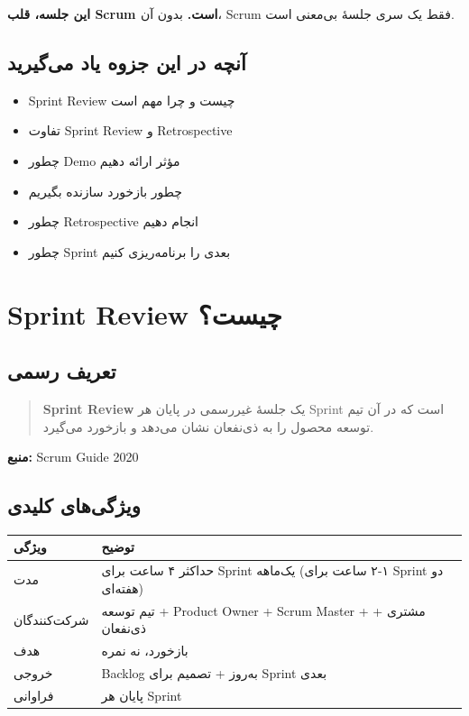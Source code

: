 \documentclass[12pt, a4paper]{article}
\begin{document}
\textbf{این جلسه، قلب Scrum است.} بدون آن، Scrum فقط یک سری جلسهٔ بی‌معنی 
است.

\subsection{آنچه در این جزوه یاد می‌گیرید}
\begin{itemize}
    \item Sprint Review چیست و چرا مهم است
    \item تفاوت Sprint Review و Retrospective
    \item چطور Demo مؤثر ارائه دهیم
    \item چطور بازخورد سازنده بگیریم
    \item چطور Retrospective انجام دهیم
    \item چطور Sprint بعدی را برنامه‌ریزی کنیم
\end{itemize}

\section{Sprint Review چیست؟}

\subsection{تعریف رسمی}
\begin{quote}
\textbf{Sprint Review} یک جلسهٔ غیررسمی در پایان هر Sprint است که در آن تیم 
توسعه محصول را به ذی‌نفعان نشان می‌دهد و بازخورد می‌گیرد.
\end{quote}

\textbf{منبع:} Scrum Guide 2020

\subsection{ویژگی‌های کلیدی}

\begin{center}
\begin{tabular}{|l|p{9cm}|}
\hline
\textbf{ویژگی} & \textbf{توضیح} \\
\hline
مدت & حداکثر ۴ ساعت برای Sprint یک‌ماهه (۱-۲ ساعت برای Sprint دو هفته‌ای) \\
\hline
شرکت‌کنندگان & تیم توسعه + Product Owner + Scrum Master + مشتری + ذی‌نفعان 
\\
\hline
هدف & بازخورد، نه نمره \\
\hline
خروجی & Backlog به‌روز + تصمیم برای Sprint بعدی \\
\hline
فراوانی & پایان هر Sprint \\
\hline
\end{tabular}
\end{center}
\end{document}
